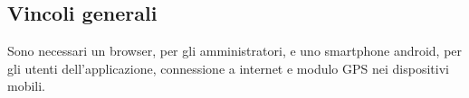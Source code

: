 \subsection{Vincoli generali}
Sono necessari un browser, per gli amministratori, e uno smartphone android, per gli utenti dell'applicazione, connessione a internet e modulo GPS nei dispositivi mobili.